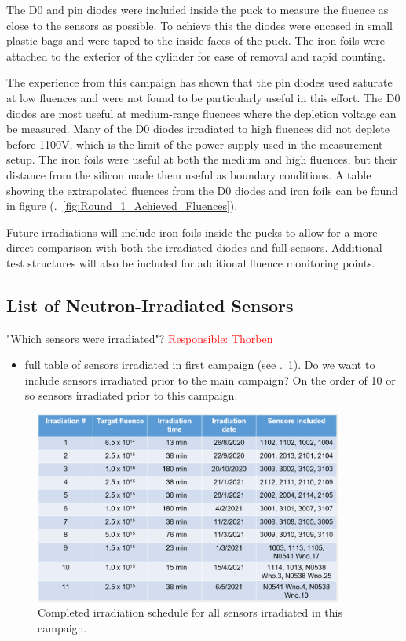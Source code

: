 The D0 and pin diodes were included inside the puck to measure the fluence as close to the sensors as possible.
To achieve this the diodes were encased in small plastic bags and were taped to the inside faces of the puck. 
The iron foils were attached to the exterior of the cylinder for ease of removal and rapid counting. 

The experience from this campaign has shown that the pin diodes used saturate at low fluences and were not found to be particularly useful in this effort. 
The D0 diodes are most useful at medium-range fluences where the depletion voltage can be measured. 
Many of the D0 diodes irradiated to high fluences did not deplete before 1100V, which is the limit of the power supply used in the measurement setup. 
The iron foils were useful at both the medium and high fluences, but their distance from the silicon made them useful as boundary conditions. 
A table showing the extrapolated fluences from the D0 diodes and iron foils can be found in figure (.~\ref{fig:Round_1_Achieved_Fluences}).

Future irradiations will include iron foils inside the pucks to allow for a more direct comparison with both the irradiated diodes and full sensors. 
Additional test structures will also be included for additional fluence monitoring points.

\subsection{List of Neutron-Irradiated Sensors}
\label{subsec:sensors_irradiation}
"Which sensors were irradiated"? \textcolor{red}{Responsible: Thorben}
\begin{itemize}
  \item full table of sensors irradiated in first campaign (see .~\ref{fig:Irradiation_Schedule}). Do we want to include sensors irradiated prior to the main campaign? On the order of 10 or so sensors irradiated prior to this campaign.
\end{itemize}

\begin{figure}[!hbt]
  \begin{center}
    \includegraphics[width=0.90\textwidth]{figures/Completed_Irradiation_Schedule_at_RINSC}
    \caption{Completed irradiation schedule for all sensors irradiated in this campaign.}
    \label{fig:Irradiation_Schedule}
  \end{center}
\end{figure}

